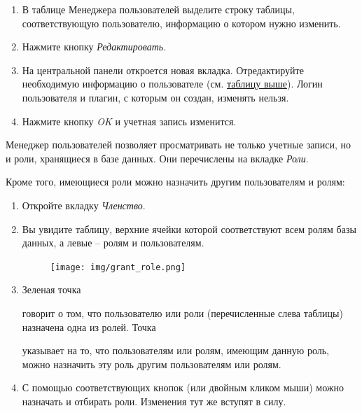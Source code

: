 
\begin{enumerate}[leftmargin=39pt]
	\item В таблице Менеджера пользователей выделите строку таблицы, соответствующую пользователю, информацию о котором нужно изменить.
	\item Нажмите кнопку \textit{Редактировать}.
	\item На центральной панели откроется новая вкладка. Отредактируйте необходимую информацию о пользователе (см. \hyperref[tab:adduser]{таблицу выше}). Логин пользователя и плагин, с которым он создан, изменять нельзя. 	
	\item Нажмите кнопку \textit{OK} и учетная запись изменится.
\end{enumerate}	

Менеджер пользователей позволяет просматривать не только учетные записи, но и роли, хранящиеся в базе данных. Они перечислены на вкладке \textit{Роли}.

Кроме того, имеющиеся роли можно назначить другим пользователям и ролям:

\begin{enumerate}[leftmargin=39pt]
	\item Откройте вкладку \textit{Членство}. 
	\item Вы увидите таблицу, верхние ячейки которой соответствуют всем ролям базы данных, а левые -- ролям и пользователям.
	\begin{figure}[H]
		\flushright
		\texttt{[image: img/grant\_role.png]}
	\end{figure}
	\item Зеленая точка  говорит о том, что пользователю или роли (перечисленные слева таблицы) назначена одна из ролей. Точка  указывает на то, что пользователям или ролям, имеющим данную роль, можно назначить эту роль другим пользователям или ролям.
	
	\item С помощью соответствующих кнопок (или двойным кликом мыши) можно назначать и отбирать роли. Изменения тут же вступят в силу.
\end{enumerate}	

